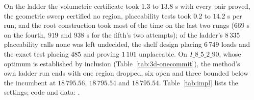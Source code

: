 On the ladder the volumetric certificate took $1.3$ to $13.8$ s with
every pair proved, the geometric sweep certified no region,
placeability tests took $0.2$ to $14.2$ s per run, and the root
construction took most of the time on the last two rungs ($669$ s on
the fourth, $919$ and $938$ s for the fifth's two attempts); of the
ladder's $8\,335$ placeability calls none was left undecided, the
shelf design placing $6\,749$ loads and the exact test placing $485$
and proving $1\,101$ unplaceable. On $I\_8\_5\_2\_90$, whose optimum is
established by inclusion (Table~\ref{tab:3d-onecommit}), the method's
own ladder run ends with one region dropped, six open and three bounded
below the incumbent at $18\,795.56$, $18\,795.54$ and $18\,795.54$. Table~\ref{tab:impl} lists the settings; code and data:
.

